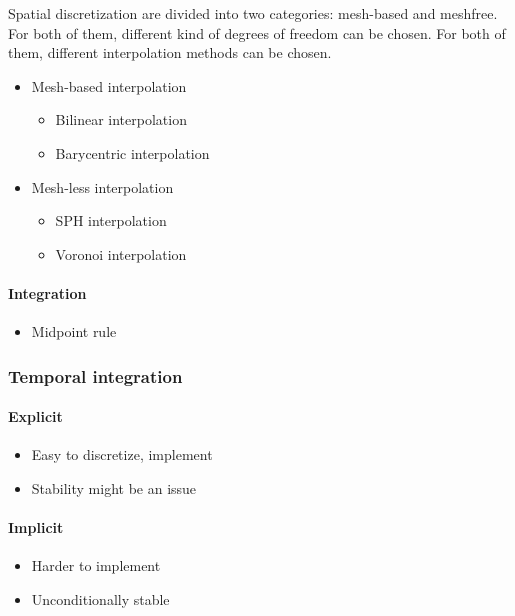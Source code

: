 \documentclass[11pt, oneside, a4paper]{memoir}
\begin{document}
Spatial discretization are divided into two categories: mesh-based and meshfree. For both of them, different kind of degrees of freedom can be chosen. For both of them, different interpolation methods can be chosen. 

\begin{itemize}
\item Mesh-based interpolation
\begin{itemize}
\item Bilinear interpolation
\item Barycentric interpolation
\end{itemize}
\item Mesh-less interpolation
\begin{itemize}
\item SPH interpolation
\item Voronoi interpolation
\end{itemize}
\end{itemize}

\paragraph{Integration}

\begin{itemize}
\item Midpoint rule
\end{itemize}

\subsubsection{Temporal integration}

\paragraph{Explicit}
\begin{itemize}
\item Easy to discretize, implement
\item Stability might be an issue
\end{itemize}

\paragraph{Implicit}
\begin{itemize}
\item Harder to implement
\item Unconditionally stable
\end{itemize}
\end{document}

